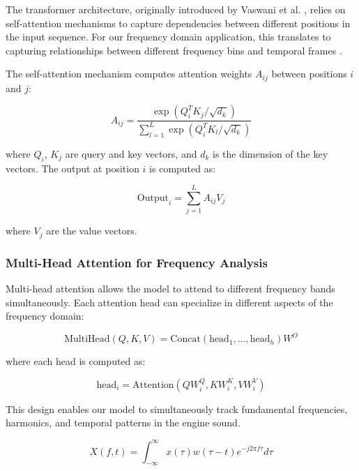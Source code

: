 \documentclass[journal,10pt]{IEEEtran}
\begin{document}
The transformer architecture, originally introduced by Vaswani et al. \cite{transformer}, relies on self-attention mechanisms to capture dependencies between different positions in the input sequence. For our frequency domain application, this translates to capturing relationships between different frequency bins and temporal frames \cite{audio_transformer}.

The self-attention mechanism computes attention weights $A_{ij}$ between positions $i$ and $j$:

\begin{equation}
A_{ij} = \frac{\exp(Q_i^T K_j / \sqrt{d_k})}{\sum_{l=1}^{L} \exp(Q_i^T K_l / \sqrt{d_k})}
\end{equation}

where $Q_i$, $K_j$ are query and key vectors, and $d_k$ is the dimension of the key vectors. The output at position $i$ is computed as:

\begin{equation}
\text{Output}_i = \sum_{j=1}^{L} A_{ij} V_j
\end{equation}

where $V_j$ are the value vectors.

\subsubsection{Multi-Head Attention for Frequency Analysis}

Multi-head attention allows the model to attend to different frequency bands simultaneously. Each attention head can specialize in different aspects of the frequency domain:

\begin{equation}
\text{MultiHead}(Q, K, V) = \text{Concat}(\text{head}_1, \ldots, \text{head}_h)W^O
\end{equation}

where each head is computed as:

\begin{equation}
\text{head}_i = \text{Attention}(QW_i^Q, KW_i^K, VW_i^V)
\end{equation}

This design enables our model to simultaneously track fundamental frequencies, harmonics, and temporal patterns in the engine sound.

\begin{equation}
X(f, t) = \int_{-\infty}^{\infty} x(\tau) w(\tau - t) e^{-j2\pi f\tau} d\tau
\end{equation}
\end{document}

